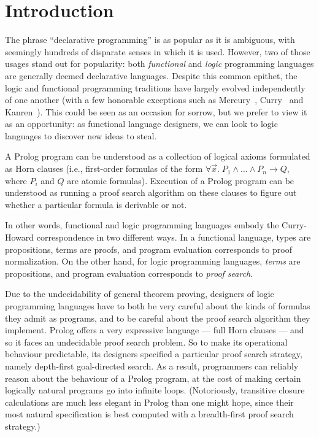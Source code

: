 \section{Introduction}

The phrase ``declarative programming'' is as popular as it is
ambiguous, with seemingly hundreds of disparate senses in which it is
used. However, two of those usages stand out for popularity: both
\emph{functional} and \emph{logic} programming languages are generally
deemed declarative languages. Despite this common epithet, the logic
and functional programming traditions have largely evolved
independently of one another (with a few honorable exceptions such as
Mercury~\cite{mercury}, Curry~\cite{curry} and
Kanren~\cite{kanren}). This could be seen as an occasion for sorrow,
but we prefer to view it as an opportunity: as functional language
designers, we can look to logic languages to discover new ideas to
steal.

A Prolog program can be understood as a collection of logical axioms
formulated as Horn clauses (i.e., first-order formulas of the form
$\forall \vec{x}.\;P_1 \land \ldots \land P_n \to Q$, where $P_i$ and
$Q$ are atomic formulas).  Execution of a Prolog program can be
understood as running a proof search algorithm on these clauses to
figure out whether a particular formula is derivable or not.

In other words, functional and logic programming languages embody the
Curry-Howard correspondence in two different ways. In a functional
language, types are propositions, terms are proofs, and program
evaluation corresponds to proof normalization. On the other hand, for
logic programming languages, \emph{terms} are propositions, and
program evaluation corresponds to \emph{proof search}.

Due to the undecidability of general theorem proving, designers of
logic programming languages have to both be very careful about the
kinds of formulas they admit as programs, and to be careful about the
proof search algorithm they implement. Prolog offers a very expressive
language --- full Horn clauses --- and so it faces an undecidable
proof search problem. So to make its operational behaviour
predictable, its designers specified a particular proof search
strategy, namely depth-first goal-directed search. As a result,
programmers can reliably reason about the behaviour of a Prolog
program, at the cost of making certain logically natural programs go
into infinite loops. (Notoriously, transitive closure calculations are
much less elegant in Prolog than one might hope, since their most
natural specification is best computed with a breadth-first proof
search strategy.)

